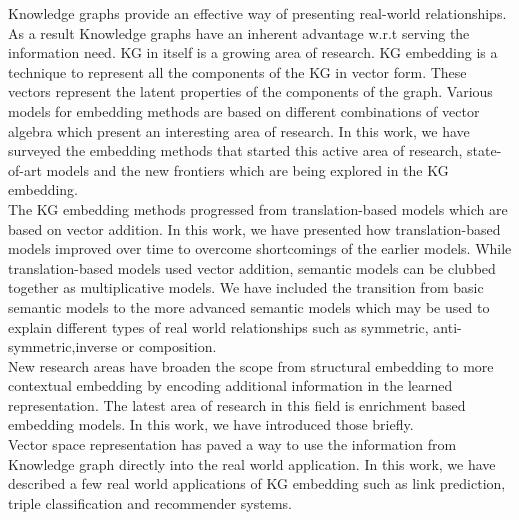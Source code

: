 Knowledge graphs provide an effective way of presenting real-world relationships. As a result Knowledge graphs have an inherent advantage w.r.t serving the information need. KG in itself is a growing area of research. KG embedding is a technique to represent all the components of the KG in vector form. These vectors represent the latent properties of the components of the graph. Various models for embedding methods are based on different combinations of vector algebra which present an interesting area of research. In this work, we have surveyed the embedding methods that started this active area of research, state-of-art models and the new frontiers which are being explored in the KG embedding. \\
The KG embedding methods progressed from translation-based models which are based on vector addition. In this work, we have presented how translation-based models improved over time to overcome shortcomings of the earlier models. While translation-based models used vector addition, semantic models can be clubbed together as multiplicative models. We have included the transition from basic semantic models to the more advanced semantic models which may be used to explain different types of real world relationships such as symmetric, anti-symmetric,inverse or composition.\\
New research areas have broaden the scope from structural embedding to more contextual embedding by encoding additional information in the learned representation. The latest area of research in this field is enrichment based embedding models. In this work, we have introduced those briefly. \\
Vector space representation has paved a way to use the information from Knowledge graph directly into the real world application. In this work, we have described a few real world applications of KG embedding such as link prediction, triple classification and recommender systems.


\appendix
